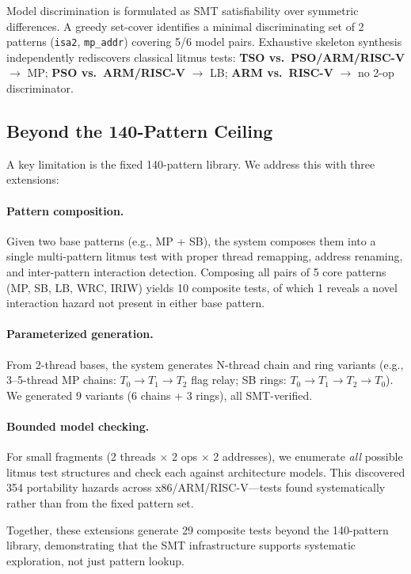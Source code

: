 \documentclass[11pt]{article}
\begin{document}
Model discrimination is formulated as SMT satisfiability over
symmetric differences. A greedy set-cover identifies a minimal
discriminating set of 2 patterns (\texttt{isa2}, \texttt{mp\_addr})
covering 5/6 model pairs.
Exhaustive skeleton synthesis independently rediscovers classical
litmus tests: \textbf{TSO vs.\ PSO/ARM/RISC-V} $\to$ MP;
\textbf{PSO vs.\ ARM/RISC-V} $\to$ LB;
\textbf{ARM vs.\ RISC-V} $\to$ no 2-op discriminator.

\subsection{Beyond the 140-Pattern Ceiling}
\label{sec:pattern-composition}

A key limitation is the fixed 140-pattern library. We address
this with three extensions:

\paragraph{Pattern composition.}
Given two base patterns (e.g., MP + SB), the system composes them
into a single multi-pattern litmus test with proper thread remapping,
address renaming, and inter-pattern interaction detection.
Composing all pairs of 5 core patterns (MP, SB, LB, WRC, IRIW)
yields 10 composite tests, of which 1 reveals a novel
interaction hazard not present in either base pattern.

\paragraph{Parameterized generation.}
From 2-thread bases, the system generates N-thread chain and ring
variants (e.g., 3--5-thread MP chains: $T_0 \to T_1 \to T_2$
flag relay; SB rings: $T_0 \to T_1 \to T_2 \to T_0$).
We generated 9 variants (6 chains + 3 rings), all SMT-verified.

\paragraph{Bounded model checking.}
For small fragments (2 threads $\times$ 2 ops $\times$ 2 addresses),
we enumerate \emph{all} possible litmus test structures and check
each against architecture models. This discovered 354 portability
hazards across x86/ARM/RISC-V---tests found systematically rather
than from the fixed pattern set.

Together, these extensions generate 29 composite tests beyond the
140-pattern library, demonstrating that the SMT infrastructure
supports systematic exploration, not just pattern lookup.
\end{document}
